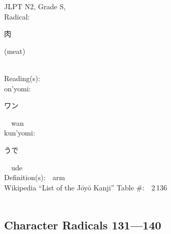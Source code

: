 \begin{multicols}{2}
{JLPT N2, Grade S, \\Radical:\ \ {\begin{CJK}{UTF8}{min} 肉 \end{CJK}} (meat) } \\
Reading(s):\ \ \\
{\hspace*{1em}}on'yomi:\ \ \\
{\hspace*{2em}}{\begin{CJK}{UTF8}{min} ワン \end{CJK}}\ \ wan\ \ \\
{\hspace*{1em}}kun'yomi:\ \ \\
{\hspace*{2em}}{\begin{CJK}{UTF8}{min} うで \end{CJK}}\ \ ude\ \ \\
Definition(s):\ \ arm \\
Wikipedia ``List of the J\=oy\=o Kanji'' Table \#:\ \ 2\,136 \\
\ \ \\
\end{multicols}



\newpage



\subsection*{Character Radicals 131---140 }
  \label{P3-S15}

